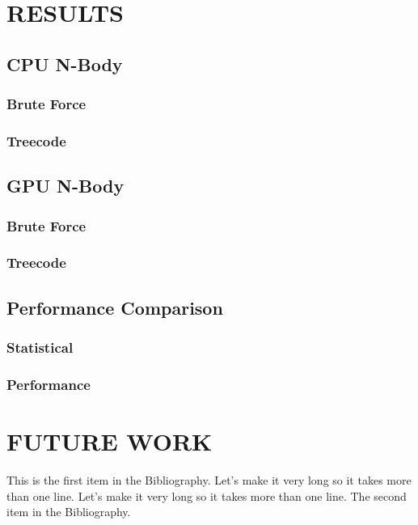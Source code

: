 \documentclass{thesis}
\begin{document}
\chapter{RESULTS}
\section{CPU N-Body}
\subsection{Brute Force}
\subsection{Treecode}
\section{GPU N-Body}
\subsection{Brute Force}
\subsection{Treecode}
\section{Performance Comparison}
\subsection{Statistical}
\subsection{Performance}

\chapter{FUTURE WORK}

\begin{singlespace}
\begin{thebibliography}{99}
 This is the first item in the Bibliography.
Let's make it very long so it takes more than one line.
Let's make it very long so it takes more than one line.
 The second item in the Bibliography.
\end{thebibliography}
\end{singlespace}
\end{document}
